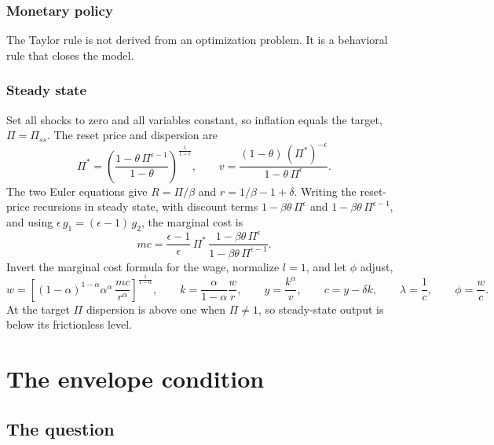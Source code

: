 \documentclass[11pt]{article}
\begin{document}
\subsubsection{Monetary policy}

The Taylor rule is not derived from an optimization problem. It is a behavioral rule that closes the model.

\subsubsection{Steady state}

Set all shocks to zero and all variables constant, so inflation equals the target, $\Pi = \Pi_{ss}$. The reset price and dispersion are
\begin{equation*}
\Pi^{*} = \left( \frac{1 - \theta\, \Pi^{\epsilon-1}}{1-\theta} \right)^{\frac{1}{1-\epsilon}},
\qquad
v = \frac{(1-\theta)\, (\Pi^{*})^{-\epsilon}}{1 - \theta\, \Pi^{\epsilon}} .
\end{equation*}
The two Euler equations give $R = \Pi/\beta$ and $r = 1/\beta - 1 + \delta$. Writing the reset-price recursions in steady state, with discount terms $1 - \beta\theta\, \Pi^{\epsilon}$ and $1 - \beta\theta\, \Pi^{\epsilon-1}$, and using $\epsilon\, g_1 = (\epsilon-1)\, g_2$, the marginal cost is
\begin{equation*}
mc = \frac{\epsilon-1}{\epsilon}\, \Pi^{*}\, \frac{1 - \beta\theta\, \Pi^{\epsilon}}{1 - \beta\theta\, \Pi^{\epsilon-1}} .
\end{equation*}
Invert the marginal cost formula for the wage, normalize $l = 1$, and let $\phi$ adjust,
\begin{equation*}
w = \left[ (1-\alpha)^{1-\alpha} \alpha^{\alpha}\, \frac{mc}{r^{\alpha}} \right]^{\frac{1}{1-\alpha}},
\qquad
k = \frac{\alpha}{1-\alpha} \frac{w}{r}, \qquad
y = \frac{k^{\alpha}}{v}, \qquad
c = y - \delta k, \qquad
\lambda = \frac{1}{c}, \qquad
\phi = \frac{w}{c} .
\end{equation*}
At the target $\Pi$ dispersion is above one when $\Pi \ne 1$, so steady-state output is below its frictionless level.

\appendix

\section{The envelope condition}

\subsection{The question}
\end{document}
